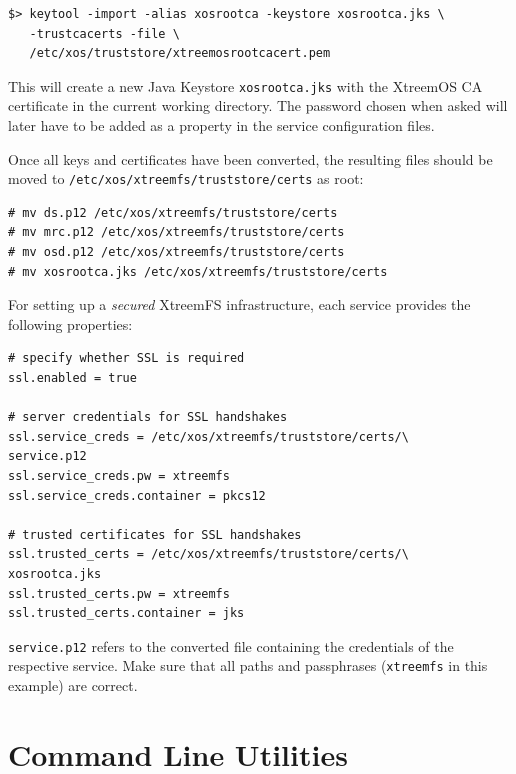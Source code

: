 \documentclass[a4paper,10pt]{book}
\begin{document}
\begin{verbatim}
$> keytool -import -alias xosrootca -keystore xosrootca.jks \
   -trustcacerts -file \
   /etc/xos/truststore/xtreemosrootcacert.pem
\end{verbatim}

This will create a new Java Keystore \texttt{xosrootca.jks} with the XtreemOS CA certificate in the current working directory. The password chosen when asked will later have to be added as a property in the service configuration files.

Once all keys and certificates have been converted, the resulting files should be moved to \texttt{/etc/xos/xtreemfs/truststore/certs} as root:


\begin{verbatim}
# mv ds.p12 /etc/xos/xtreemfs/truststore/certs
# mv mrc.p12 /etc/xos/xtreemfs/truststore/certs
# mv osd.p12 /etc/xos/xtreemfs/truststore/certs
# mv xosrootca.jks /etc/xos/xtreemfs/truststore/certs
\end{verbatim}


For setting up a \textit{secured} XtreemFS infrastructure, each service provides the following properties:


\begin{verbatim}
# specify whether SSL is required
ssl.enabled = true

# server credentials for SSL handshakes
ssl.service_creds = /etc/xos/xtreemfs/truststore/certs/\
service.p12
ssl.service_creds.pw = xtreemfs
ssl.service_creds.container = pkcs12

# trusted certificates for SSL handshakes
ssl.trusted_certs = /etc/xos/xtreemfs/truststore/certs/\
xosrootca.jks
ssl.trusted_certs.pw = xtreemfs
ssl.trusted_certs.container = jks
\end{verbatim}

\texttt{service.p12} refers to the converted file containing the credentials of the respective service. Make sure that all paths and passphrases (\texttt{xtreemfs} in this example) are correct.



\chapter{Command Line Utilities}
\end{document}
